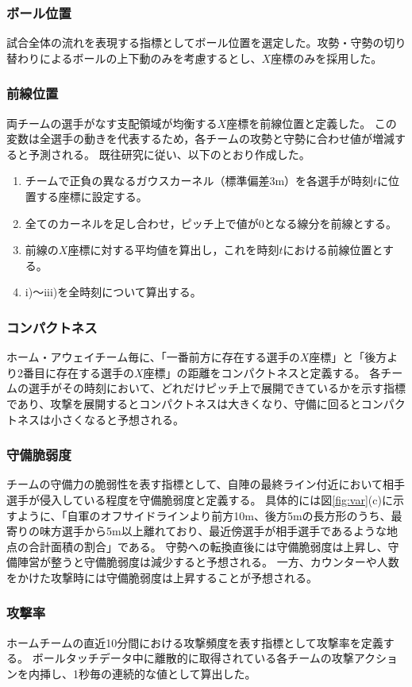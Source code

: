 \subsubsection{ボール位置}
試合全体の流れを表現する指標としてボール位置を選定した。攻勢・守勢の切り替わりによるボールの上下動のみを考慮するとし、$X$座標のみを採用した。

\subsubsection{前線位置}
両チームの選手がなす支配領域が均衡する$X$座標を前線位置と定義した。
この変数は全選手の動きを代表するため，各チームの攻勢と守勢に合わせ値が増減すると予測される。
既往研究\cite{kij}に従い、以下のとおり作成した。
\begin{enumerate}
\renewcommand{\labelenumi}{\roman{enumi})}
\setlength{\itemsep}{-5pt}
 \item チームで正負の異なるガウスカーネル（標準偏差3m）を各選手が時刻$t$に位置する座標に設定する。
 \item 全てのカーネルを足し合わせ，ピッチ上で値が0となる線分を前線とする。
 \item 前線の$X$座標に対する平均値を算出し，これを時刻$t$における前線位置とする。
 \item i)～iii)を全時刻について算出する。
\end{enumerate}

\subsubsection{コンパクトネス}
ホーム・アウェイチーム毎に、「一番前方に存在する選手の$X$座標」と「後方より2番目に存在する選手の$X$座標」の距離をコンパクトネスと定義する。
各チームの選手がその時刻において、どれだけピッチ上で展開できているかを示す指標であり、攻撃を展開するとコンパクトネスは大きくなり、守備に回るとコンパクトネスは小さくなると予想される。

\subsubsection{守備脆弱度}
チームの守備力の脆弱性を表す指標として、自陣の最終ライン付近において相手選手が侵入している程度を守備脆弱度と定義する。
具体的には図\ref{fig:var}(c)に示すように、「自軍のオフサイドラインより前方10m、後方5mの長方形のうち、最寄りの味方選手から5m以上離れており、最近傍選手が相手選手であるような地点の合計面積の割合」である。
守勢への転換直後には守備脆弱度は上昇し、守備陣営が整うと守備脆弱度は減少すると予想される。
一方、カウンターや人数をかけた攻撃時には守備脆弱度は上昇することが予想される。

\subsubsection{攻撃率}
ホームチームの直近10分間における攻撃頻度を表す指標として攻撃率を定義する。
ボールタッチデータ中に離散的に取得されている各チームの攻撃アクションを内挿し、1秒毎の連続的な値として算出した。






